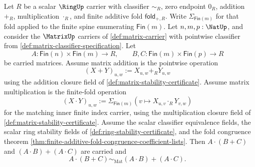 \begin{theorem}
\label{thm:matrix-multiplication-left-distributes-over-addition}
Let $R$ be a scalar $\RingUp$ carrier with classifier $\sim_R$, zero endpoint $0_R$, addition $+_R$, multiplication $\cdot_R$, and finite additive fold $\mathsf{fold}_{+,R}$. Write $\Sigma_{\mathsf{Fin}(m)}$ for that fold applied to the finite spine enumerating $\mathsf{Fin}(m)$. Let $n,m,p:\NatUp$, and consider the $\MatrixUp$ carriers of \autoref{def:matrix-carrier} with pointwise classifier from \autoref{def:matrix-classifier-specification}. Let
$$
A:\mathsf{Fin}(n)\times\mathsf{Fin}(m)\to R,
\qquad
B,C:\mathsf{Fin}(m)\times\mathsf{Fin}(p)\to R
$$
be carried matrices. Assume matrix addition is the pointwise operation
$$
(X+Y)_{u,w}:=X_{u,w}+_RY_{u,w}
$$
using the addition closure field of \autoref{def:matrix-stability-certificate}. Assume matrix multiplication is the finite-fold operation
$$
(X\cdot Y)_{u,w}:=\Sigma_{\mathsf{Fin}(m)}(v\mapsto X_{u,v}\cdot_RY_{v,w})
$$
for the matching inner finite index carrier, using the multiplication closure field of \autoref{def:matrix-stability-certificate}. Assume the scalar classifier equivalence fields, the scalar ring stability fields of \autoref{def:ring-stability-certificate}, and the fold congruence theorem \autoref{thm:finite-additive-fold-congruence-coefficient-lists}. Then $A\cdot(B+C)$ and $(A\cdot B)+(A\cdot C)$ are carried and
$$
A\cdot(B+C)\sim_{\mathrm{Mat}}(A\cdot B)+(A\cdot C).
$$
\end{theorem}
